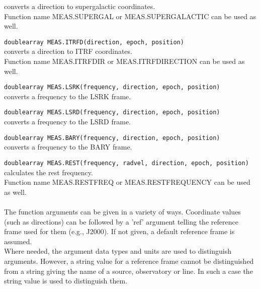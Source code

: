 \begin{description}
    converts a direction to supergalactic coordinates.
    \\Function name MEAS.SUPERGAL or MEAS.SUPERGALACTIC can be used as well.
  \item[] \texttt{doublearray MEAS.ITRFD(direction, epoch, position)}\\
    converts a direction to ITRF coordinates.
    \\Function name MEAS.ITRFDIR or MEAS.ITRFDIRECTION can be used as well.
  \item[] \texttt{doublearray MEAS.LSRK(frequency, direction, epoch, position)}\\
    converts a frequency to the LSRK frame.
  \item[] \texttt{doublearray MEAS.LSRD(frequency, direction, epoch, position)}\\
    converts a frequency to the LSRD frame.
  \item[] \texttt{doublearray MEAS.BARY(frequency, direction, epoch, position)}\\
    converts a frequency to the BARY frame.
  \item[] \texttt{doublearray MEAS.REST(frequency, radvel, direction, epoch, position)}\\
    calculates the rest frequency.
    \\Function name MEAS.RESTFREQ or MEAS.RESTFREQUENCY can be used as well.
\end{description}


\paragraph*{}
The function arguments can be given in a variety of ways.
Coordinate values (such as directions) can be followed by a 'ref'
argument telling the reference frame used for them (e.g., J2000). If not given,
a default reference frame is assumed.
\\Where
needed, the argument data types and units are used to distinguish
arguments. However, a string value for a reference frame cannot be
distinguished from a string giving the name of a source, observatory
or line. In such a case the string value is used to distinguish them.

